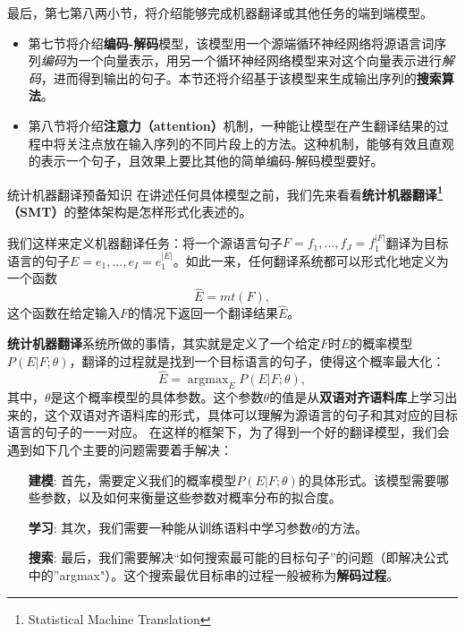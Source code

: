 \documentclass[10pt,a4paper]{ctexart}
\makeatletter
\renewcommand{\section}{\@startsection{section}{1}{0mm}
  {-\baselineskip}{0.5\baselineskip}{\bf\leftline}}
\makeatother
\begin{document}
最后，第七第八两小节，将介绍能够完成机器翻译或其他任务的端到端模型。

\begin{itemize}
\item 第七节将介绍\textbf{编码-解码}模型，该模型用一个源端循环神经网络将源语言词序列\textit{编码}为一个向量表示，用另一个循环神经网络模型来对这个向量表示进行\textit{解码}，进而得到输出的句子。本节还将介绍基于该模型来生成输出序列的\textbf{搜索算法}。
\item 第八节将介绍\textbf{注意力（attention）}机制，一种能让模型在产生翻译结果的过程中将关注点放在输入序列的不同片段上的方法。这种机制，能够有效且直观的表示一个句子，且效果上要比其他的简单编码-解码模型要好。
\end{itemize}

\section{统计机器翻译预备知识}
在讲述任何具体模型之前，我们先来看看\textbf{统计机器翻译\footnote{Statistical Machine Translation}（SMT）}\cite{brown1993mathematics}的整体架构是怎样形式化表述的。

我们这样来定义机器翻译任务：将一个源语言句子$F = f_1,...,f_J = f_1^{|F|}$翻译为目标语言的句子$E = e_1,...,e_I = e_1^{|E|}$。如此一来，任何翻译系统都可以形式化地定义为一个函数
\[
  \hat{E} = mt(F),
\]
这个函数在给定输入$F$的情况下返回一个翻译结果$\hat{E}$。

\textbf{统计机器翻译}系统所做的事情，其实就是定义了一个给定$F$时$E$的概率模型$P(E|F;\theta)$，翻译的过程就是找到一个目标语言的句子，使得这个概率最大化：
\[
 \hat{E} = \mathop{\arg\max}_{E} P(E|F;\theta),
\]
其中，$\theta$是这个概率模型的具体参数。这个参数$\theta$的值是从\textbf{双语对齐语料库}上学习出来的，这个双语对齐语料库的形式，具体可以理解为源语言的句子和其对应的目标语言的句子的一一对应。
在这样的框架下，为了得到一个好的翻译模型，我们会遇到如下几个主要的问题需要着手解决：
\begin{enumerate}
\item[\textbf{建模}:] 首先，需要定义我们的概率模型$P(E | F;\theta)$的具体形式。该模型需要哪些参数，以及如何来衡量这些参数对概率分布的拟合度。
\item[\textbf{学习}:] 其次，我们需要一种能从训练语料中学习参数$\theta$的方法。
\item[\textbf{搜索}:] 最后，我们需要解决“如何搜索最可能的目标句子”的问题（即解决公式中的''argmax"）。这个搜索最优目标串的过程一般被称为\textbf{解码过程}。
\end{enumerate}
\end{document}
